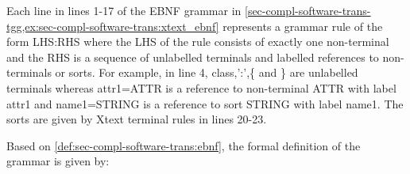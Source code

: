 \begin{example}
\label{ex:sec-compl-software-trans:ebnf}
Each line in lines 1-17 of the EBNF grammar in \cref{sec-compl-software-trans-tgg,ex:sec-compl-software-trans:xtext_ebnf} represents a grammar rule of the form LHS:RHS where the LHS of the rule consists of exactly one non-terminal and the RHS is a sequence of unlabelled terminals and labelled references to non-terminals or sorts.
For example, in line 4, \textsf{class},\textsf{':'},\textsf{\{} and \textsf{\}} are unlabelled terminals whereas \textsf{attr1=ATTR} is a reference to non-terminal \textsf{ATTR} with label \textsf{attr1} and \textsf{name1=STRING} is a reference to sort \textsf{STRING} with label \textsf{name1}.
The sorts are given by Xtext terminal rules in lines 20-23.

Based on \cref{def:sec-compl-software-trans:ebnf}, the formal definition of the grammar is given by:


\end{example}
